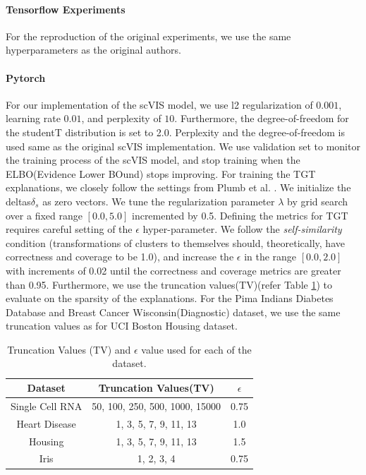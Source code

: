 \paragraph{Tensorflow \cite{abadi2016tensorflow} Experiments}
For the reproduction of the original experiments, we use the same hyperparameters as the original authors.

\paragraph{Pytorch}
For our implementation of the scVIS model, we use l2 regularization of $0.001$, learning rate $0.01$, and perplexity of $10$. Furthermore, the degree-of-freedom for the studentT distribution is set to 2.0. Perplexity and the degree-of-freedom is used same as the original scVIS implementation. We use validation set to monitor the training process of the scVIS model, and stop training when the ELBO(Evidence Lower BOund)\cite{kingma2014autoencoding} stops improving. For training the TGT explanations, we closely follow the settings from Plumb et al. \cite{plumb2020explaining}. We initialize the deltas$\delta_{s}$ as zero vectors. We tune the regularization parameter $\lambda$ by grid search over a fixed range $[0.0, 5.0]$ incremented by 0.5. Defining the metrics for TGT requires careful setting of the $\epsilon$ hyper-parameter.  We follow the \textit{self-similarity} condition (transformations of clusters to themselves should, theoretically, have correctness and coverage to be 1.0), and increase the $\epsilon$ in the range $[0.0, 2.0]$ with increments of 0.02 until the correctness and coverage metrics are greater than 0.95.  Furthermore, we use the truncation values(TV)(refer Table \ref{tab:tv}) to evaluate on the sparsity of the explanations. For the Pima Indians Diabetes Database and Breast Cancer Wisconsin(Diagnostic) dataset, we use the same truncation values as for UCI Boston Housing dataset.

\begin{table}[!ht]
    \centering
    \begin{tabular}{|c|c|c|}
    \hline
     \bf Dataset & \bf{Truncation Values(TV)} & \bf{$\epsilon$} \\
     \hline
        Single Cell RNA & 50, 100, 250, 500, 1000, 15000 & 0.75 \\
        \hline
        Heart Disease & 1, 3, 5, 7, 9, 11, 13 & 1.0 \\
        \hline
        Housing & 1, 3, 5, 7, 9, 11, 13 & 1.5 \\
        \hline
        Iris & 1, 2, 3, 4 & 0.75 \\
        \hline
    \end{tabular}
    \caption{Truncation Values (TV) and $\epsilon$ value used for each of the dataset.}
    \label{tab:tv}
\end{table}



